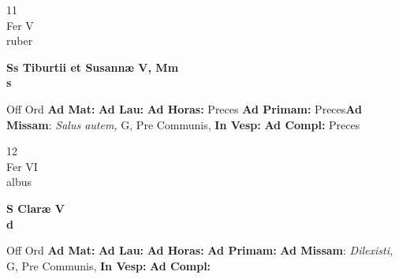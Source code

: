 \documentclass[10pt, openany]{book}
\begin{document}
        \begin{center}
            \begin{minipage}{3.5in}
                \vspace{2em}
                \begin{minipage}{0.5in}
                    {\Huge 11} \\
                    {\normalsize Fer V} \\
                    {\normalsize ruber}
                \end{minipage}
                \begin{minipage}{3.0in}
                    \textbf{ \large Ss Tiburtii et Susannæ V, Mm \\
                    \textnormal{\normalsize s}} \\ 
                \end{minipage}
                \begin{justify}Off Ord
                    \textbf{Ad Mat: }
                    \textbf{Ad Lau: }
                    \textbf{Ad Horas: }Preces
                    \textbf{Ad Primam: }Preces\textbf{Ad Missam}: \textit{Salus autem,} G, Pre Communis,  
                    \textbf{In Vesp: }
                    \textbf{Ad Compl: }Preces
                \end{justify}
            \end{minipage}
        \end{center}
    
        \begin{center}
            \begin{minipage}{3.5in}
                \vspace{2em}
                \begin{minipage}{0.5in}
                    {\Huge 12} \\
                    {\normalsize Fer VI} \\
                    {\normalsize albus}
                \end{minipage}
                \begin{minipage}{3.0in}
                    \textbf{ \large S Claræ V \\
                    \textnormal{\normalsize d}} \\ 
                \end{minipage}
                \begin{justify}Off Ord
                    \textbf{Ad Mat: }
                    \textbf{Ad Lau: }
                    \textbf{Ad Horas: }
                    \textbf{Ad Primam: }\textbf{Ad Missam}: \textit{Dilexisti,} G, Pre Communis,  
                    \textbf{In Vesp: }
                    \textbf{Ad Compl: }
                \end{justify}
            \end{minipage}
        \end{center}
    
\end{document}

